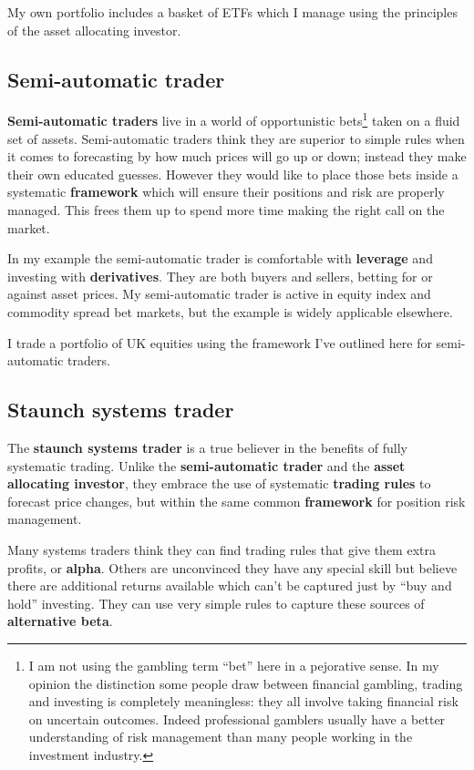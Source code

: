 My own portfolio includes a basket of ETFs which I manage using the principles of the asset allocating investor.

\subsection*{Semi-automatic trader} \textbf{Semi-automatic traders} live in a world of opportunistic bets\footnote{I am not using the gambling term ``bet'' here in a pejorative sense. In my opinion the distinction some people draw between financial gambling, trading and investing is completely meaningless: they all involve taking financial risk on uncertain outcomes. Indeed professional gamblers usually have a better understanding of risk management than many people working in the investment industry.} taken on a fluid set of assets. Semi-automatic traders think they are superior to simple rules when it comes to forecasting by how much prices will go up or down; instead they make their own educated guesses. However they would like to place those bets inside a systematic \textbf{framework} which will ensure their positions and risk are properly managed. This frees them up to spend more time making the right call on the market.

In my example the semi-automatic trader is comfortable with \textbf{leverage} and investing with \textbf{derivatives}. They are both buyers and sellers, betting for or against asset prices. My semi-automatic trader is active in equity index and commodity spread bet markets, but the example is widely applicable elsewhere.

I trade a portfolio of UK equities using the framework I've outlined here for semi-automatic traders.

\subsection*{Staunch systems trader}

The \textbf{staunch systems trader} is a true believer in the benefits of fully systematic trading. Unlike the \textbf{semi-automatic trader} and the \textbf{asset allocating investor}, they embrace the use of systematic \textbf{trading rules} to forecast price changes, but within the same common \textbf{framework} for position risk management.

Many systems traders think they can find trading rules that give them extra profits, or \textbf{alpha}. Others are unconvinced they have any special skill but believe there are additional returns available which can't be captured just by ``buy and hold'' investing. They can use very simple rules to capture these sources of \textbf{alternative beta}.

